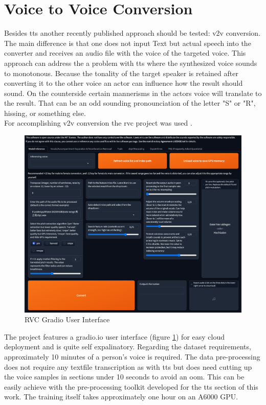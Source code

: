 \documentclass[
  a4paper,  %
  twoside,  %
  bibliography=totoc,
  headsepline,
  cleardoublepage=empty,
  parskip=half,
  draft=false
]{scrbook}
\begin{document}
\section{Voice to Voice Conversion}
\label{sec:v2v}
Besides \gls{tts} another recently published approach should be tested: \gls{v2v} conversion. The main difference is that one does not input Text but actual speech into the converter and receives an audio file with the voice of the targeted voice. This approach can address the a problem with \gls{tts} where the synthesized voice sounds to monotonous. Because the tonality of the target speaker is retained after converting it to the other voice an actor can influence how the result should sound. On the counterside certain mannerisms in the actors voice will translate to the result. That can be an odd sounding pronounciation of the letter "S" or "R", hissing, or something else. \\
For accomplishing \gls{v2v} conversion the \gls{rvc} project was used \cite{RVCProjectRetrievalbasedVoiceConversionWebUI2023}. 
\begin{figure}[h]
  \centering
  \includegraphics[width=1\textwidth]{./graphics/images/RVC-UI.png}
  \caption{RVC Gradio User Interface}
  \label{fig:rvc-gradio}
\end{figure}
The project features a gradio.io user interface (figure \ref{fig:rvc-gradio}) for easy cloud deployment and is quite self expalinatory. Regarding the dataset requirements, approximately 10 minutes of a person's voice is required. The data pre-processing does not require any textfile transcription as with \gls{tts} but does need cutting up the voice samples in sections under 10 seconds to avoid an \gls{oom}. This can be easily achieve with the pre-processing toolkit developed for the \gls{tts} section of this work. The training itself takes approximately one hour on an A6000 GPU. \\
\end{document}
